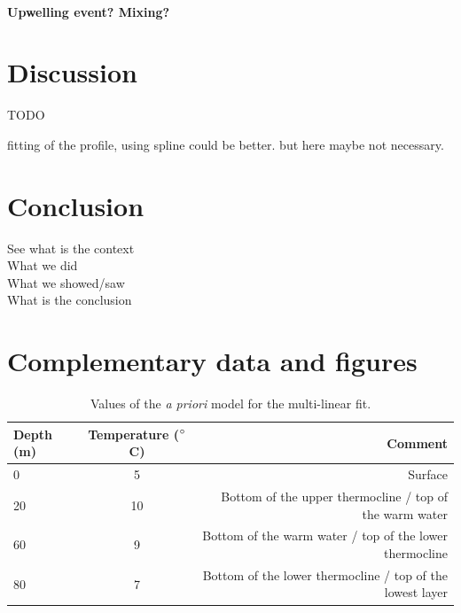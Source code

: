\documentclass[12pt,a4paper]{article}
\begin{document}
\paragraph{Upwelling event? Mixing?}
\citep{arneborg2003}

\section{Discussion}

TODO

fitting of the profile, using spline could be better. but here maybe not necessary. 

\section{Conclusion}

See what is the context\\
What we did\\
What we showed/saw\\
What is the conclusion





\newpage

\appendix
\setcounter{figure}{0}

\section{Complementary data and figures}

\begin{table}[h]
  \centering
  \begin{tabular}{|l|c|r|}
    \hline
    Depth (m) & Temperature ($^{\circ}$C) & Comment \\
    \hline
    0 & 5 & Surface\\
    20 & 10 & Bottom of the upper thermocline / top of the warm water\\
    60 & 9 & Bottom of the warm water / top of the lower thermocline\\
    80 & 7 & Bottom of the lower thermocline / top of the lowest layer\\
    \hline
  \end{tabular}
  \caption{\label{tab:apriori}Values of the {\it a priori} model for the multi-linear fit.}
\end{table}
\end{document}
